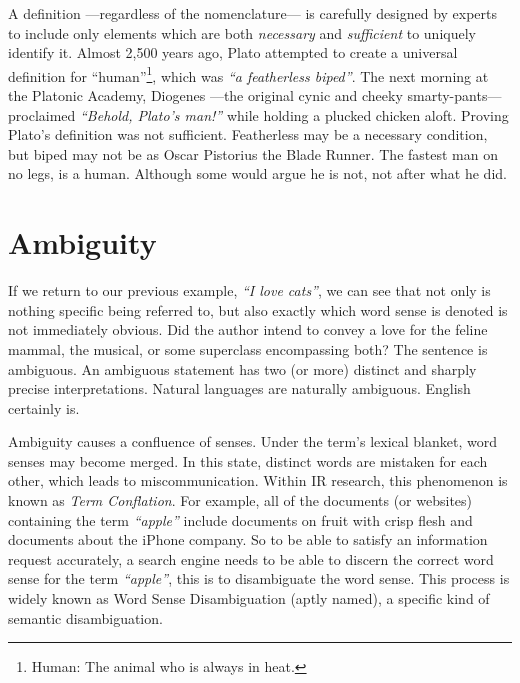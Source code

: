 A definition ---regardless of the nomenclature--- is carefully designed by experts to include only elements which are both \textit{necessary} and \textit{sufficient} to uniquely identify it. Almost 2,500 years ago, Plato attempted to create a universal definition for ``human''\footnote{Human: The animal who is always in heat.}, which was \textit{``a featherless biped''}. The next morning at the Platonic Academy, Diogenes ---the original cynic and cheeky smarty-pants--- proclaimed \textit{``Behold, Plato's man!''} while holding a plucked chicken aloft. Proving Plato's definition was not sufficient. Featherless may be a necessary condition, but biped may not be as Oscar Pistorius the Blade Runner. The fastest man on no legs, is a human. Although some would argue he is not, not after what he did.
 



\section{Ambiguity}
If we return to our previous example, \textit{``I love cats''}, we can see that not only is nothing specific being referred to, but also exactly which word sense is denoted is not immediately obvious. Did the author intend to convey a love for the feline mammal, the musical, or some superclass encompassing both? The sentence is ambiguous. An ambiguous statement has two (or more) distinct and sharply precise interpretations. Natural languages are naturally ambiguous. English certainly is.

Ambiguity causes a confluence of senses. Under the term's lexical blanket, word senses may become merged. In this state, distinct words are mistaken for each other, which leads to miscommunication. Within IR research, this phenomenon is known as \textit{Term Conflation}. For example, all of the documents (or websites) containing the term \textit{``apple''} include documents on fruit with crisp flesh and documents about the iPhone company. So to be able to satisfy an information request accurately, a search engine needs to be able to discern the correct word sense for the term \textit{``apple''}, this is to disambiguate the word sense. This process is widely known as Word Sense Disambiguation (aptly named), a specific kind of semantic disambiguation.

